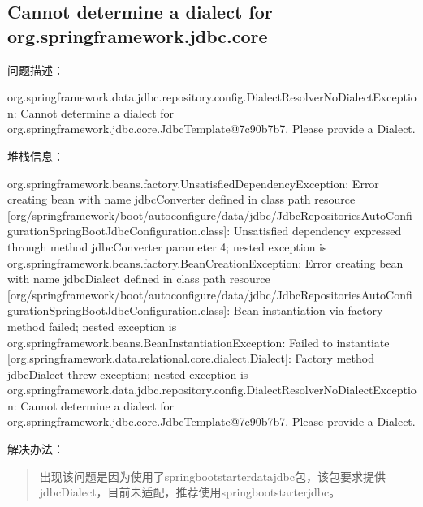 \documentclass[a4,10pt,oneside,english]{sphinxmanual}
\begin{document}
\subsection{Cannot determine a dialect for org.springframework.jdbc.core}
\label{\detokenize{interface/spring-jdbc:cannot-determine-a-dialect-for-org-springframework-jdbc-core}}
问题描述：

\begin{sphinxVerbatim}[commandchars=\\\{\}]
org.springframework.data.jdbc.repository.config.DialectResolver\PYGZdl{}NoDialectException: Cannot determine a dialect for org.springframework.jdbc.core.JdbcTemplate@7c90b7b7. Please provide a Dialect.
\end{sphinxVerbatim}

堆栈信息：

\begin{sphinxVerbatim}[commandchars=\\\{\}]
org.springframework.beans.factory.UnsatisfiedDependencyException: Error creating bean with name \PYGZsq{}jdbcConverter\PYGZsq{} defined in class path resource [org/springframework/boot/autoconfigure/data/jdbc/JdbcRepositoriesAutoConfiguration\PYGZdl{}SpringBootJdbcConfiguration.class]: Unsatisfied dependency expressed through method \PYGZsq{}jdbcConverter\PYGZsq{} parameter 4; nested exception is org.springframework.beans.factory.BeanCreationException: Error creating bean with name \PYGZsq{}jdbcDialect\PYGZsq{} defined in class path resource [org/springframework/boot/autoconfigure/data/jdbc/JdbcRepositoriesAutoConfiguration\PYGZdl{}SpringBootJdbcConfiguration.class]: Bean instantiation via factory method failed; nested exception is org.springframework.beans.BeanInstantiationException: Failed to instantiate [org.springframework.data.relational.core.dialect.Dialect]: Factory method \PYGZsq{}jdbcDialect\PYGZsq{} threw exception; nested exception is org.springframework.data.jdbc.repository.config.DialectResolver\PYGZdl{}NoDialectException: Cannot determine a dialect for org.springframework.jdbc.core.JdbcTemplate@7c90b7b7. Please provide a Dialect.
\end{sphinxVerbatim}

解决办法：
\begin{quote}

出现该问题是因为使用了spring\sphinxhyphen{}boot\sphinxhyphen{}starter\sphinxhyphen{}data\sphinxhyphen{}jdbc包，该包要求提供jdbcDialect，目前未适配，推荐使用spring\sphinxhyphen{}boot\sphinxhyphen{}starter\sphinxhyphen{}jdbc。
\end{quote}
\end{document}
